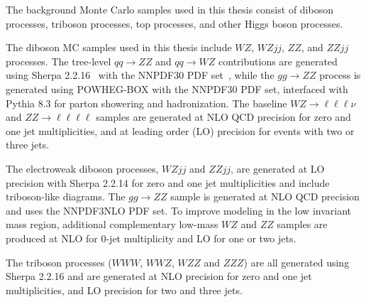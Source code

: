 The background Monte Carlo samples used in this thesis consist of diboson processes, triboson processes, top processes, and other Higgs boson processes.


The diboson MC samples used in this thesis include $WZ$, $WZjj$, $ZZ$, and $ZZjj$ processes. The tree-level $qq \rightarrow ZZ$ and $qq \rightarrow WZ$ contributions are generated using Sherpa 2.2.16~\cite{Sherpa:2019gpd} with the NNPDF30 PDF set~\cite{NNPDF:2014otw}, while the $gg \rightarrow ZZ$ process is generated using POWHEG-BOX with the NNPDF30 PDF set, interfaced with Pythia 8.3 for parton showering and hadronization. The baseline $WZ \rightarrow \ell\ell\ell\nu$ and $ZZ \rightarrow \ell\ell\ell\ell$ samples are generated at NLO QCD precision for zero and one jet multiplicities, and at leading order (LO) precision for events with two or three jets.

The electroweak diboson processes, $WZjj$ and $ZZjj$, are generated at LO precision with Sherpa 2.2.14 for zero and one jet multiplicities and include triboson-like diagrams. The $gg \rightarrow ZZ$ sample is generated at NLO QCD precision and uses the NNPDF3NLO PDF set. To improve modeling in the low invariant mass region, additional complementary low-mass $WZ$ and $ZZ$ samples are produced at NLO for 0-jet multiplicity and LO for one or two jets.

The triboson processes ($WWW$, $WWZ$, $WZZ$ and $ZZZ$) are all generated using Sherpa 2.2.16 and are generated at NLO precision for zero and one jet multiplicities, and LO precision for two and three jets.

